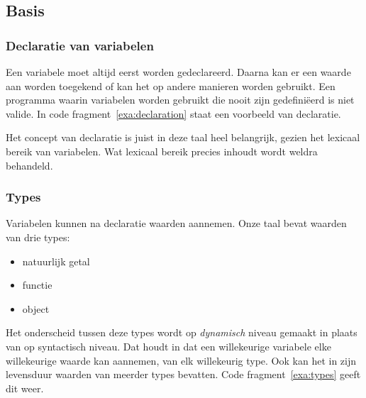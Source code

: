 \subsection{Basis}

\subsubsection{Declaratie van variabelen}

Een variabele moet altijd eerst worden gedeclareerd. Daarna kan er een waarde aan worden toegekend of kan het op andere manieren worden gebruikt. Een programma waarin variabelen worden gebruikt die nooit zijn gedefiniëerd is niet valide. In code fragment~\ref{exa:declaration} staat een voorbeeld van declaratie.

\codeFragmentCaption
{}

Het concept van declaratie is juist in deze taal heel belangrijk, gezien het lexicaal bereik van variabelen. Wat lexicaal bereik precies inhoudt wordt weldra behandeld.

\subsubsection{Types}
\label{subsec:taal-types}

Variabelen kunnen na declaratie waarden aannemen. Onze taal bevat waarden van drie types:
\begin{itemize}
  \item natuurlijk getal
  \item functie
  \item object
\end{itemize}%
Het onderscheid tussen deze types wordt op \emph{dynamisch} niveau gemaakt in plaats van op syntactisch niveau. Dat houdt in dat een willekeurige variabele elke willekeurige waarde kan aannemen, van elk willekeurig type. Ook kan het in zijn levensduur waarden van meerder types bevatten. Code fragment~\ref{exa:types} geeft dit weer.

\codeFragmentCaption
{}

